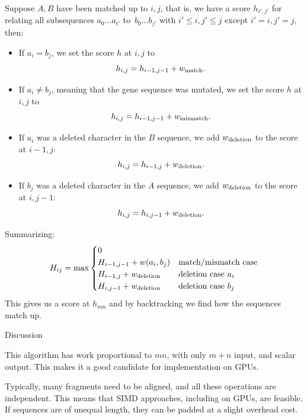 Suppose $A,B$ have been matched up to $i,j$, that is, 
we have a score $h_{i',j'}$
for relating all subsequences
$a_0\ldots a_{i'}$ to~$b_0\ldots b_{j'}$ with $i'\leq i,j'\leq j$
except $i'=i,j'=j$, then:
\begin{itemize}
\item If $a_i=b_j$, we set the score $h$ at $i,j$ to
  \[ h_{i,j} = h_{i-1,j-1}+w_{\mathrm{match}}. \]
\item If $a_i\not=b_j$, meaning that the gene sequence was mutated,
  we set the score $h$ at $i,j$ to
  \[ h_{i,j} = h_{i-1,j-1}+w_{\mathrm{mismatch}}. \]
\item If $a_i$ was a deleted character in the $B$ sequence,
  we add $w_{\mathrm{deletion}}$ to the score at $i-1,j$:
  \[ h_{i,j} = h_{i-1,j}+w_{\mathrm{deletion}}. \]
\item If $b_j$ was a deleted character in the $A$ sequence,
  we add $w_{\mathrm{deletion}}$ to the score at $i,j-1$:
  \[ h_{i,j} = h_{i,j-1}+w_{\mathrm{deletion}}. \]
\end{itemize}
Summarizing:
\[ H_{ij} = \max
\begin{cases}
  0\\
  H_{i-1,j-1}+w(a_i,b_j)&\hbox{match/mismatch case}\\
  H_{i-1,j}+w_{\mathrm{deletion}}       &\hbox{deletion case $a_i$}\\
  H_{i,j-1}+w_{\mathrm{deletion}}       &\hbox{deletion case $b_j$}\\
\end{cases}
\]
This gives us a score at $h_{mn}$ and by backtracking we find
how the sequences match up.

 {Discussion}

%
This algorithm has work proportional to $mn$, with only $m+n$ input,
and scalar output. This makes it a good candidate for implementation on \acp{GPU}.

%
Typically, many fragments need to be aligned, and all these operations
are independent. This means that SIMD approaches, including on
\acp{GPU}, are feasible. If sequences are of unequal length, they can
be padded at a slight overhead cost.

